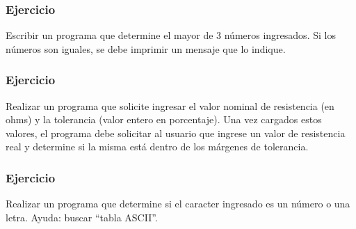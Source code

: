 \subsubsection{Ejercicio}
Escribir un programa que determine el mayor de 3 números ingresados. Si los números son iguales, se debe imprimir un mensaje que lo indique.
{\small
  \lstset{inputencoding=utf8/latin1}
  
}

\subsubsection{Ejercicio}
Realizar un programa que solicite ingresar el valor nominal de resistencia (en ohms) y la tolerancia (valor entero en porcentaje). Una vez cargados estos valores, el programa debe solicitar al usuario que ingrese un valor de resistencia real y determine si la misma está dentro de los márgenes de tolerancia. 
{\small
  \lstset{inputencoding=utf8/latin1}
  
}

\subsubsection{Ejercicio}
Realizar un programa que determine si el caracter ingresado es un número o una letra. Ayuda: buscar ``tabla ASCII''.
{\small
  \lstset{inputencoding=utf8/latin1}
  
}

